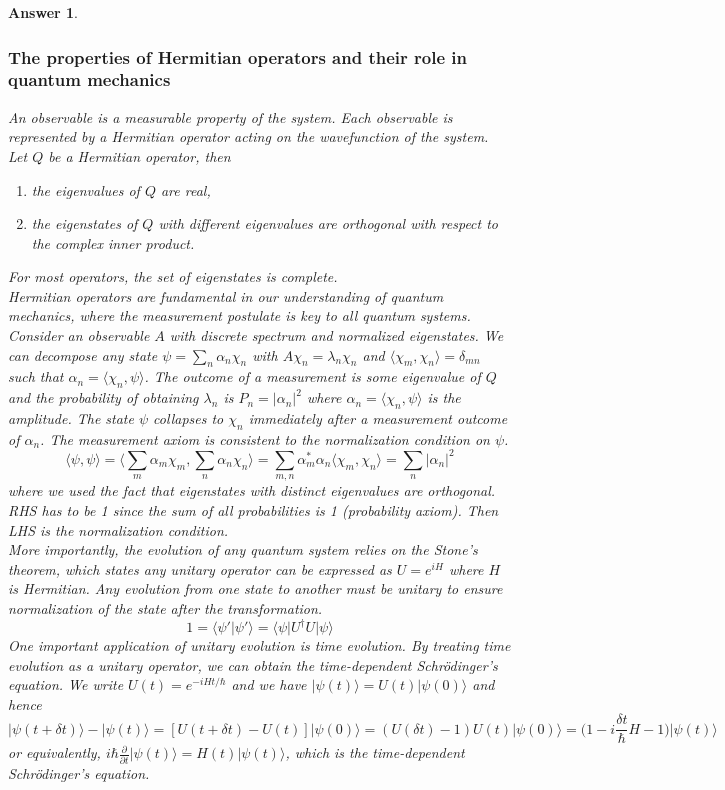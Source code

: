 \documentclass[a4paper]{article}
\newtheorem{ans}{Answer}[subsection]
\theoremstyle{new}
\begin{document}
\begin{ans}
\subsubsection*{The properties of Hermitian operators and their role in quantum mechanics}
An observable is a measurable property of the system. Each observable is represented by a Hermitian operator acting on the wavefunction of the system. Let $Q$ be a Hermitian operator, then
\begin{enumerate}
    \item the eigenvalues of $Q$ are real,
    \item the eigenstates of $Q$ with different eigenvalues are orthogonal with respect to the complex inner product.
\end{enumerate}
For most operators, the set of eigenstates is complete.\\[5pt]
Hermitian operators are fundamental in our understanding of quantum mechanics, where the measurement postulate is key to all quantum systems. Consider an observable $A$ with discrete spectrum and normalized eigenstates. We can decompose any state $\psi=\sum_n\alpha_n\chi_n$ with $A\chi_n=\lambda_n\chi_n$ and $\langle\chi_m,\chi_n\rangle=\delta_{mn}$ such that $\alpha_n=\langle\chi_n,\psi\rangle$. The outcome of a measurement is some eigenvalue of $Q$ and the probability of obtaining $\lambda_n$ is $P_n=|\alpha_n|^2$ where $\alpha_n=\langle\chi_n,\psi\rangle$ is the amplitude. The state $\psi$ collapses to $\chi_n$ immediately after a measurement outcome of $\alpha_n$. The measurement axiom is consistent to the normalization condition on $\psi$.
$$\langle\psi,\psi\rangle=\bigg\langle\sum_m\alpha_m\chi_m,\sum_n\alpha_n\chi_n\bigg\rangle=\sum_{m,n}\alpha_m^*\alpha_n\langle\chi_m,\chi_n\rangle=\sum_n|\alpha_n|^2$$
where we used the fact that eigenstates with distinct eigenvalues are orthogonal. RHS has to be 1 since the sum of all probabilities is 1 (probability axiom). Then LHS is the normalization condition.\\[5pt]
More importantly, the evolution of any quantum system relies on the Stone's theorem, which states any unitary operator can be expressed as $U=e^{iH}$ where $H$ is Hermitian. Any evolution from one state to another must be unitary to ensure normalization of the state after the transformation.
$$1=\langle\psi'|\psi'\rangle=\langle\psi|U^\dag U|\psi\rangle$$
One important application of unitary evolution is time evolution. By treating time evolution as a unitary operator, we can obtain the time-dependent Schr\"{o}dinger's equation. We write $U(t)=e^{-iHt/\hbar}$ and we have $|\psi(t)\rangle=U(t)|\psi(0)\rangle$ and hence
$$|\psi(t+\delta t)\rangle-|\psi(t)\rangle=[U(t+\delta t)-U(t)]|\psi(0)\rangle=(U(\delta t)-1)U(t)|\psi(0)\rangle=\bigg(1-i\frac{\delta t}{\hbar}H-1\bigg)|\psi(t)\rangle$$
or equivalently, $i\hbar\frac{\partial}{\partial t}|\psi(t)\rangle=H(t)|\psi(t)\rangle$, which is the time-dependent Schr\"{o}dinger's equation.
\end{ans}
\newpage
\end{document}
